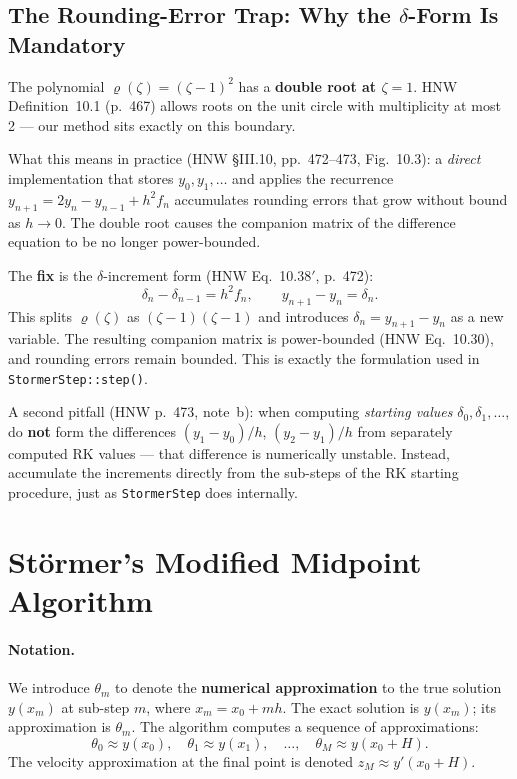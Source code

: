 \documentclass[11pt]{article}
\begin{document}
\subsection{The Rounding-Error Trap: Why the $\delta$-Form Is Mandatory}
\label{ssec:double-root}

The polynomial $\varrho(\zeta) = (\zeta-1)^2$ has a \textbf{double root at
$\zeta = 1$}.  HNW Definition~10.1 (p.~467) allows roots on the unit circle
with multiplicity at most 2 --- our method sits exactly on this boundary.

What this means in practice (HNW §III.10, pp.~472--473, Fig.~10.3): a
\emph{direct} implementation that stores $y_0, y_1, \ldots$ and applies the
recurrence $y_{n+1} = 2y_n - y_{n-1} + h^2 f_n$ accumulates rounding errors
that grow without bound as $h \to 0$.  The double root causes the companion
matrix of the difference equation to be no longer power-bounded.

The \textbf{fix} is the $\delta$-increment form (HNW Eq.~10.38$'$, p.~472):
\begin{equation}
  \label{eq:delta-stable}
  \delta_n - \delta_{n-1} = h^2 f_n,
  \qquad
  y_{n+1} - y_n = \delta_n.
\end{equation}
This splits $\varrho(\zeta)$ as $(\zeta-1)(\zeta-1)$ and introduces $\delta_n =
y_{n+1} - y_n$ as a new variable.  The resulting companion matrix is
power-bounded (HNW Eq.~10.30), and rounding errors remain bounded.  This is
exactly the formulation used in \texttt{StormerStep::step()}.

A second pitfall (HNW p.~473, note~b): when computing \emph{starting values}
$\delta_0, \delta_1, \ldots$, do \textbf{not} form the differences
$(y_1 - y_0)/h$, $(y_2 - y_1)/h$ from separately computed RK values --- that
difference is numerically unstable.  Instead, accumulate the increments
directly from the sub-steps of the RK starting procedure, just as
\texttt{StormerStep} does internally.

\section{Störmer's Modified Midpoint Algorithm}
\label{sec:stormer-alg}

\paragraph{Notation.} We introduce $\theta_m$ to denote the \textbf{numerical approximation} to the true solution $y(x_m)$ at sub-step $m$, where $x_m = x_0 + mh$. The exact solution is $y(x_m)$; its approximation is $\theta_m$. The algorithm computes a sequence of approximations:
\[
\theta_0 \approx y(x_0),\quad \theta_1 \approx y(x_1),\quad \ldots,\quad \theta_M \approx y(x_0 + H).
\]
The velocity approximation at the final point is denoted $z_M \approx y'(x_0 + H)$.
\end{document}
